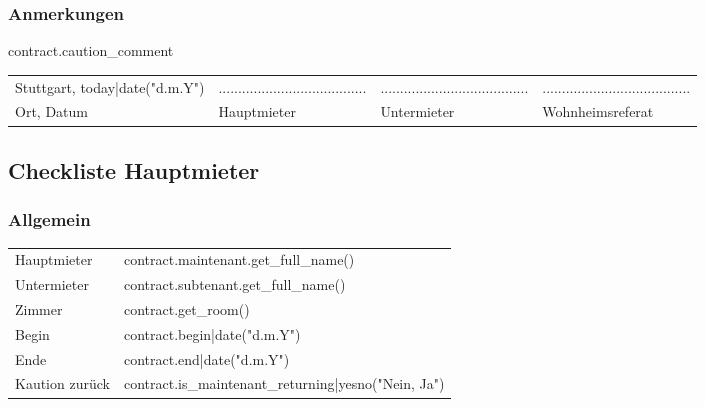 \documentclass[9pt,pdftex,a4paper]{article}
\newcommand{\signLine}{......................................}
\begin{document}
{{{{{{%
\subsubsection*{Anmerkungen}

{{ contract.caution_comment }}

{%

\vfill

\begin{tabularx}{\textwidth}{@{}YYYY@{}}
Stuttgart, {{ today|date("d.m.Y") }} & \signLine & \signLine & \signLine\\
Ort, Datum &  Hauptmieter& Untermieter & Wohnheimsreferat\\
\end{tabularx}

{%


%
%

\newpage

\subsection*{Checkliste Hauptmieter}

\subsubsection*{Allgemein}
\begin{tabularx}{\textwidth}{XX}
Hauptmieter & {{ contract.maintenant.get_full_name() }}\\
Untermieter &  {{ contract.subtenant.get_full_name() }}\\
Zimmer & {{ contract.get_room() }}\\
Begin & {{ contract.begin|date("d.m.Y") }}\\
Ende & {{ contract.end|date("d.m.Y") }}\\
Kaution zurück & {{ contract.is_maintenant_returning|yesno("Nein, Ja") }}\\
\end{tabularx}

}}}}}}}}
\end{document}
